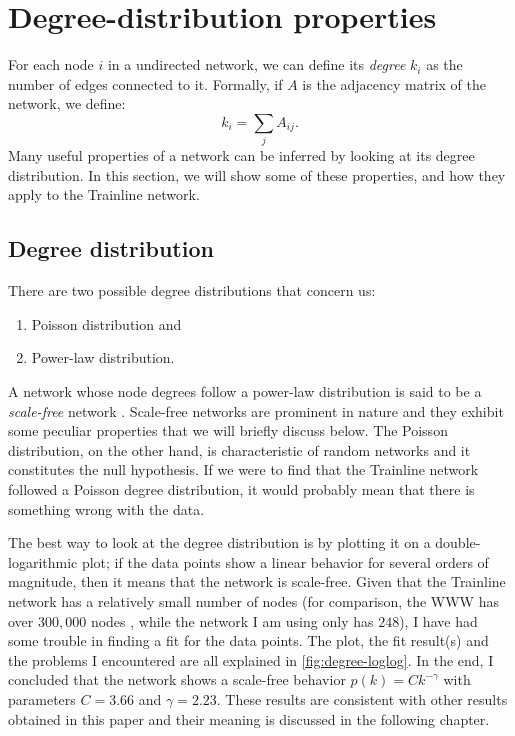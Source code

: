 \section{Degree-distribution properties}
For each node $i$ in a undirected network, we can define its \emph{degree} $k_i$ as the number of edges connected to it. Formally, if $A$ is the adjacency matrix of the network, we define:
\begin{equation*}
    k_i = \sum_j A_{ij}.
\end{equation*}
Many useful properties of a network can be inferred by looking at its degree distribution.
In this section, we will show some of these properties, and how they apply to the Trainline network.

\subsection{Degree distribution}
There are two possible degree distributions that concern us:
\begin{enumerate}
    \item Poisson distribution and
    \item Power-law distribution.
\end{enumerate}

A network whose node degrees follow a power-law distribution is said to be a \emph{scale-free} network \cite{barabasi10}. Scale-free networks are prominent in nature and they exhibit some peculiar properties that we will briefly discuss below.
The Poisson distribution, on the other hand, is characteristic of random networks \cite{barabasi3, barabasi79} and it constitutes the null hypothesis.
If we were to find that the Trainline network followed a
Poisson degree distribution, it would probably mean that there is something wrong with the data.

The best way to look at the degree distribution is by plotting it on a double-logarithmic plot; if the data points show a linear behavior for several orders of magnitude, then it means that the network is scale-free\footnotemark. 
Given that the Trainline network has a relatively small number of nodes (for comparison, the WWW has over $300,000$ nodes \cite{barabasi9}, while the network I am using only has $248$), I have had some trouble in finding a fit  for the data points. The plot, the fit result(s) and the problems I encountered are all explained in \autoref{fig:degree-loglog}.
In the end, I concluded that the network shows a scale-free behavior $p(k) = C k^{-\gamma}$ with parameters $C=3.66$ and $\gamma=2.23$. These results are consistent with other results obtained in this paper and their meaning is discussed in the following chapter.

